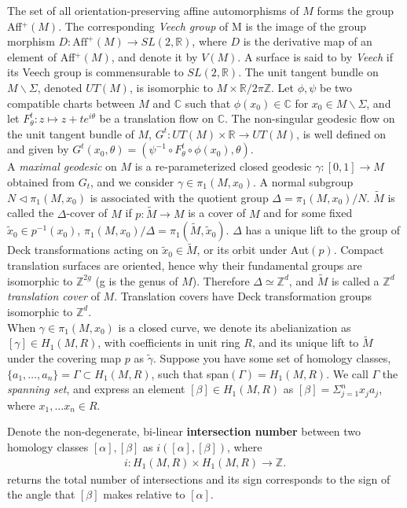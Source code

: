 \documentclass[]{article}
\begin{document}
The set of all orientation-preserving affine automorphisms of $M$ forms the group Aff$^+(M)$. The corresponding \emph{Veech group} of M is the image of the group morphism $D:\text{Aff}^+(M)\rightarrow SL(2,\mathbb{R})$, where $D$ is the derivative map of an element of Aff$^+(M)$, and denote it by $V(M)$. A surface is said to by \emph{Veech} if its Veech group is commensurable to $SL(2,\mathbb{R})$. The unit tangent bundle on $M\backslash\Sigma$, denoted $UT(M)$, is isomorphic to $M\times\mathbb{R}/2\pi\mathbb{Z}$. Let $\phi,\psi$ be two compatible charts between $M$ and $\mathbb{C}$ such that $\phi(x_0)\in\mathbb{C}$ for $x_0\in M\backslash\Sigma$, and let $F^t_\theta:z\mapsto z+te^{i\theta}$ be a translation flow on $\mathbb{C}$. The non-singular geodesic flow on the unit tangent bundle of $M$, $G^t:UT(M)\times\mathbb{R}\rightarrow UT(M)$, is well defined on and given by $G^t(x_0,\theta)=(\psi^{-1}\circ F^t_\theta\circ\phi(x_0),\theta)$. \\
A \emph{maximal geodesic} on $M$ is a re-parameterized closed geodesic $\gamma:[0,1]\rightarrow M$ obtained from $G_t$, and we consider $\gamma\in\pi_1(M,x_0)$. A normal subgroup $N\triangleleft\pi_1(M,x_0)$ is associated with the quotient group $\Delta=\pi_1(M,x_0)/N$. $\tilde{M}$ is called the $\Delta$-cover of $M$ if $p:\tilde{M}\rightarrow M$ is a cover of $M$ and for some fixed $\tilde{x}_0\in p^{-1}(x_0)$, $\pi_1(M,x_0)/\Delta=\pi_1(\tilde{M},\tilde{x}_0)$. $\Delta$ has a unique lift to the group of Deck transformations acting on $\tilde{x}_0\in\tilde{M}$, or its orbit under Aut$(p)$. Compact translation surfaces are oriented, hence why their fundamental groups are isomorphic to $\mathbb{Z}^{2g}$ (g is the genus of $M$). Therefore $\Delta\simeq \mathbb{Z}^d$, and $\tilde{M}$ is called a $\mathbb{Z}^d$ \emph{translation cover} of $M$. Translation covers have Deck transformation groups isomorphic to $\mathbb{Z}^d$. \\
When $\gamma\in\pi_1(M,x_0)$ is a closed curve, we denote its abelianization as $[\gamma]\in H_1(M,R)$, with coefficients in unit ring $R$, and its unique lift to $\tilde{M}$ under the covering map $p$ as $\tilde{\gamma}$. Suppose you have some set of homology classes, $\{a_1,\dots,a_n\}=\Gamma\subset H_1(M,R)$, such that span$(\Gamma)=H_1(M,R).$ We call $\Gamma$ the \emph{spanning set}, and express an element $[\beta]\in H_1(M,R)$ as $[\beta]=\Sigma_{j=1}^{n}x_j a_j$, where $x_1,\dots x_n\in R$.

\begin{Def}
Denote the non-degenerate, bi-linear \textbf{intersection number} between two homology classes $[\alpha],[\beta]$ as $i([\alpha],[\beta])$, where 
\begin{align*}
i:H_1(M,R)\times H_1(M, R)\rightarrow \mathbb{Z}.
\end{align*}
returns the total number of intersections and its sign corresponds to the sign of the angle that $[\beta]$ makes relative to $[\alpha]$.
\end{Def}
\end{document}
